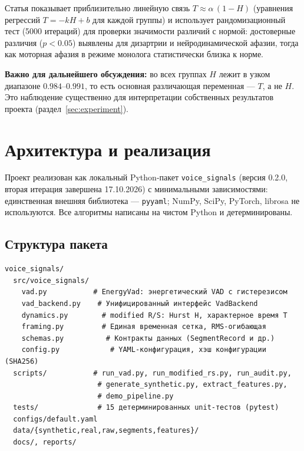 \documentclass[12pt,a4paper]{article}
\begin{document}
Статья показывает приблизительно линейную связь
$T \approx \alpha\,(1-H)$ (уравнения регрессий $T=-kH+b$ для каждой группы) и
использует рандомизационный тест (5000 итераций) для проверки значимости
различий с нормой: достоверные различия ($p<0.05$) выявлены для дизартрии
и нейродинамической афазии, тогда как моторная афазия в режиме монолога
статистически близка к норме.

\textbf{Важно для дальнейшего обсуждения:} во всех группах $H$ лежит в
узком диапазоне $0.984$--$0.991$, то есть основная различающая переменная —
$T$, а не $H$. Это наблюдение существенно для интерпретации собственных
результатов проекта (раздел~\ref{sec:experiment}).

\section{Архитектура и реализация}
\label{sec:architecture}

Проект реализован как локальный Python-пакет \texttt{voice\_signals}
(версия 0.2.0, вторая итерация завершена 17.10.2026) с минимальными
зависимостями: единственная внешняя библиотека — \texttt{pyyaml};
NumPy, SciPy, PyTorch, librosa не используются. Все алгоритмы написаны
на чистом Python и детерминированы.

\subsection{Структура пакета}

\begin{lstlisting}
voice_signals/
  src/voice_signals/
    vad.py           # EnergyVad: энергетический VAD с гистерезисом
    vad_backend.py    # Унифицированный интерфейс VadBackend
    dynamics.py        # modified R/S: Hurst H, характерное время T
    framing.py         # Единая временная сетка, RMS-огибающая
    schemas.py          # Контракты данных (SegmentRecord и др.)
    config.py            # YAML-конфигурация, хэш конфигурации (SHA256)
  scripts/           # run_vad.py, run_modified_rs.py, run_audit.py,
                      # generate_synthetic.py, extract_features.py,
                      # demo_pipeline.py
  tests/              # 15 детерминированных unit-тестов (pytest)
  configs/default.yaml
  data/{synthetic,real,raw,segments,features}/
  docs/, reports/
\end{lstlisting}
\end{document}
